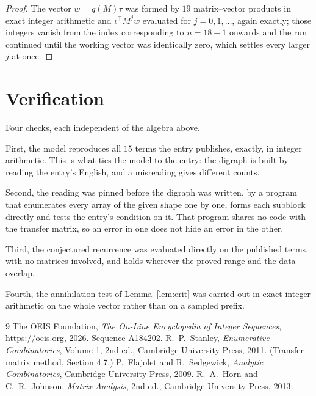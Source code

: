 \documentclass[11pt,a4paper]{article}
\theoremstyle{plain}
\theoremstyle{definition}
\begin{document}
\begin{proof}
The vector $w=q(M)\tau$ was formed by $19$ matrix--vector products in exact integer
arithmetic and $\iota^{\!\top}M^{j}w$ evaluated for $j=0,1,\dots$, again exactly; those
integers vanish from the index corresponding to $n=18+1$ onwards and the run continued
until the working vector was identically zero, which settles every larger $j$ at once.
\end{proof}

\section{Verification}

Four checks, each independent of the algebra above.

First, the model reproduces all $15$ terms the entry publishes, exactly, in integer
arithmetic. This is what ties the model to the entry: the digraph is built by reading the
entry's English, and a misreading gives different counts.

Second, the reading was pinned before the digraph was written, by a program that enumerates
every array of the given shape one by one, forms each subblock directly and tests the entry's
condition on it. That program shares no code with the transfer matrix, so an error in one does
not hide an error in the other.

Third, the conjectured recurrence was evaluated directly on the published terms, with no
matrices involved, and holds wherever the proved range and the data overlap.

Fourth, the annihilation test of Lemma~\ref{lem:crit} was carried out in exact integer
arithmetic on the whole vector rather than on a sampled prefix.

\begin{thebibliography}{9}
 The OEIS Foundation, \emph{The On-Line Encyclopedia of Integer
Sequences}, \url{https://oeis.org}, 2026. Sequence A184202.
 R.~P.~Stanley, \emph{Enumerative Combinatorics}, Volume 1, 2nd ed.,
Cambridge University Press, 2011. (Transfer-matrix method, Section 4.7.)
 P.~Flajolet and R.~Sedgewick, \emph{Analytic Combinatorics}, Cambridge
University Press, 2009.
 R.~A.~Horn and C.~R.~Johnson, \emph{Matrix Analysis}, 2nd ed., Cambridge
University Press, 2013.
\end{thebibliography}
\end{document}
